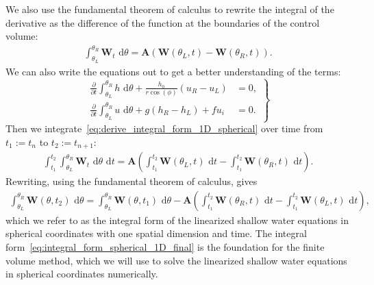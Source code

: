 We also use the fundamental theorem of calculus to rewrite the integral of the derivative as the difference of the function at the boundaries of the control volume:
\begin{align}\label{eq:derive_integral_form_1D_spherical}
    \int_{\theta_L}^{\theta_R} \mathbf{W}_t \text{ d}\theta =  \mathbf{A} \left( \mathbf{W}(\theta_L, t) - \mathbf{W}(\theta_R, t) \right).
\end{align}
We can also write the equations out to get a better understanding of the terms:
\begin{equation}\label{eq:integral_form_spherical_1D}
    \left.
    \begin{aligned}
        \frac{\partial}{\partial t} \int_{\theta_L}^{\theta_R} h \text{ d}\theta + \frac{h_0}{r \cos(\phi)} (u_R - u_L) &= 0, \\
        \frac{\partial}{\partial t} \int_{\theta_L}^{\theta_R} u \text{ d}\theta + g(h_R - h_L) + fu_i &= 0.
    \end{aligned}
    \right\}
\end{equation}
Then we integrate~\eqref{eq:derive_integral_form_1D_spherical} over time from $t_1 := t_n$ to $t_2 := t_{n+1}$:
\begin{align*}
    \int_{t_1}^{t_2} \int_{\theta_L}^{\theta_R} \mathbf{W}_t \text{ d}\theta \text{ d}t = \mathbf{A} \left( \int_{t_1}^{t_2} \mathbf{W}(\theta_L, t) \text{ d}t - \int_{t_1}^{t_2} \mathbf{W}(\theta_R, t) \text{ d}t \right).
\end{align*}
Rewriting, using the fundamental theorem of calculus, gives
\begin{align}\label{eq:integral_form_spherical_1D_final}
    \int_{\theta_L}^{\theta_R} \mathbf{W}(\theta, t_2) \text{ d}\theta = \int_{\theta_L}^{\theta_R} \mathbf{W}(\theta, t_1) \text{ d}\theta
    - \mathbf{A} \left( \int_{t_1}^{t_2} \mathbf{W}(\theta_R, t) \text{ d}t - \int_{t_1}^{t_2} \mathbf{W}(\theta_L, t) \text{ d}t \right),
\end{align}
which we refer to as the integral form of the linearized shallow water equations in spherical coordinates with one spatial dimension and time.
The integral form~\eqref{eq:integral_form_spherical_1D_final} is the foundation for the finite volume method, which we will use to solve the linearized shallow water equations in spherical coordinates numerically.



